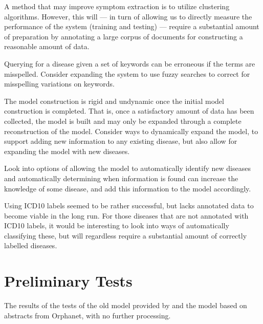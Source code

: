 \documentclass[10pt,letterpaper,two column,final]{article}
\begin{document}
A method that may improve symptom extraction is to utilize clustering
algorithms. However, this will --- in turn of allowing us to directly measure the
performance of the system (training and testing) --- require a substantial
amount of preparation by annotating a large corpus of documents for
constructing a reasonable amount of data.

Querying for a disease given a set of keywords can be erroneous if the
terms are misspelled. Consider expanding the system to use fuzzy
searches to correct for misspelling variations on keywords.

The model construction is rigid and undynamic once the initial model
construction is completed. That is, once a satisfactory amount of data
has been collected, the model is built and may only be expanded through
a complete reconstruction of the model. Consider ways to dynamically
expand the model, to support adding new information to any existing
disease, but also allow for expanding the model with new diseases.

Look into options of allowing the model to automatically identify new
diseases and automatically determining when information is found can
increase the knowledge of some disease, and add this information to the
model accordingly.

Using ICD10 labels seemed to be rather successful, but lacks annotated
data to become viable in the long run. For those diseases that are not
annotated with ICD10 labels, it would be interesting to look into ways
of automatically classifying these, but will regardless require a
substantial amount of correctly labelled diseases.


\renewcommand\bibname{References}



\newpage
\appendix
\onecolumn
\section{Preliminary Tests}
\label{app:preliminary_results}

The results of the tests of the old model provided by
\cite{jensenandersen} and the model based on abstracts from Orphanet,
with no further processing.

\end{document}
